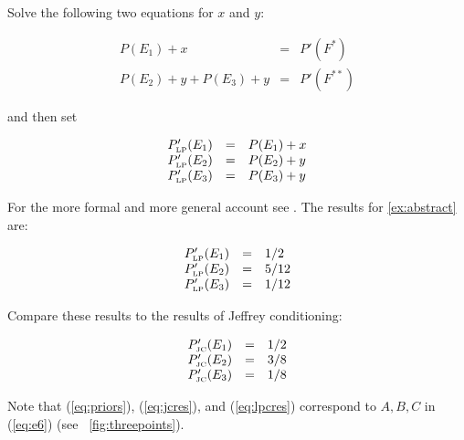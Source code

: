 \documentclass[12pt]{article}
\begin{document}
Solve the following two equations for $x$ and $y$:

\begin{equation}
  \label{eq:lpce}
  \begin{array}{rcl}
    P(E_{1})+x&=&P'(F^{*}) \\
    P(E_{2})+y+P(E_{3})+y&=&P'(F^{**})
  \end{array}
\end{equation}

and then set

\begin{equation}
  \label{eq:lpcf}
  \begin{array}{rcl}
    P'_{\mbox{\tiny LP}}(E_{1})&=&P(E_{1})+x \\
    P'_{\mbox{\tiny LP}}(E_{2})&=&P(E_{2})+y \\
    P'_{\mbox{\tiny LP}}(E_{3})&=&P(E_{3})+y
  \end{array}
\end{equation}

For the more formal and more general account see
. The results for {\xample}
\ref{ex:abstract} are:

\begin{equation}
  \label{eq:lpcres}
  \begin{array}{rcl}
    P'_{\mbox{\tiny LP}}(E_{1})&=&1/2 \\
    P'_{\mbox{\tiny LP}}(E_{2})&=&5/12 \\
    P'_{\mbox{\tiny LP}}(E_{3})&=&1/12
  \end{array}
\end{equation}

Compare these results to the results of Jeffrey conditioning:

\begin{equation}
  \label{eq:jcres}
  \begin{array}{rcl}
    P'_{\mbox{\tiny JC}}(E_{1})&=&1/2 \\
    P'_{\mbox{\tiny JC}}(E_{2})&=&3/8 \\
    P'_{\mbox{\tiny JC}}(E_{3})&=&1/8
  \end{array}
\end{equation}

Note that (\ref{eq:priors}), (\ref{eq:jcres}), and (\ref{eq:lpcres})
correspond to $A,B,C$ in (\ref{eq:e6}) (see
{\igure}~\ref{fig:threepoints}).
\end{document}
